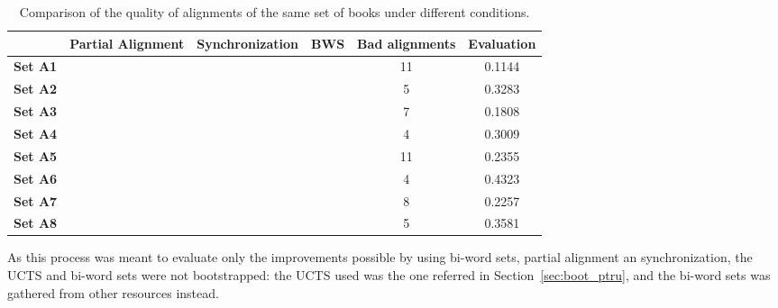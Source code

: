 \documentclass[a4paper,russian,UKenglish]{oasics}
\def\UCTSS{{\sc UCTS}}
\def\BWS{bi-word sets}
\begin{document}
\begin{table}[htb]
\centering
\caption{Comparison of the quality of alignments of the same set of books under different conditions.}
\label{tab:aligncomp}
\begin{tabular}{|l|c|c|c|c|c|}
\hline
                   &\rule{0cm}{.5cm} \parbox{2cm}{\centering\textbf{Partial Alignment}} &   \textbf{Synchronization} &   \textbf{BWS}   & \parbox{2cm}{\centering\textbf{Bad alignments}} &   \textbf{Evaluation} \\\hline\hline
 \textbf{Set A1}   &                   &                   &         &        11               &     0.1144            \\
 \textbf{Set A2}   &                   &                   &         &         5               &     0.3283            \\
 \textbf{Set A3}   &                   &                   &         &         7               &     0.1808            \\
 \textbf{Set A4}   &                   &                   &         &         4               &     0.3009            \\
 \textbf{Set A5}   &                   &                   &         &        11               &     0.2355            \\
 \textbf{Set A6}   &                   &                   &         &         4               &     0.4323            \\
 \textbf{Set A7}   &                   &  \footnotemark[1] &         &         8               &     0.2257            \\
 \textbf{Set A8}   &                   &  \footnotemark[1] &         &         5               &     0.3581            \\\hline

 \hline
\end{tabular}
\end{table}

As this process was meant to evaluate only the improvements possible by using \BWS{}, partial alignment an synchronization, the \UCTSS{} and \BWS{} were not bootstrapped: the \UCTSS{} used was the one referred in Section~\ref{sec:boot_ptru}, and the \BWS{} was gathered from other resources instead.

\end{document}
